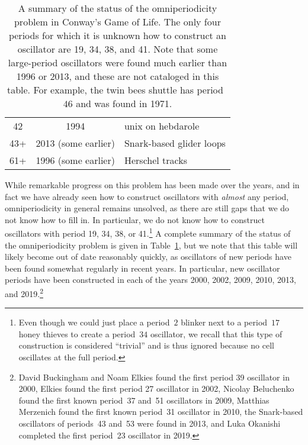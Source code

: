 \begin{table}[!ptb]
\begin{center}
\begin{tabular}{c c l}
			42 & 1994 & unix on hebdarole \\
			\rowcolor{gray!20} 43+ & 2013 (some earlier) & Snark-based glider loops \\
			61+ & 1996 (some earlier) & Herschel tracks \\\bottomrule
		\end{tabular}
		\caption{A summary of the status of the omniperiodicity problem in Conway's Game of Life. The only four periods for which it is unknown how to construct an oscillator are 19, 34, 38, and 41. Note that some large-period oscillators were found much earlier than 1996 or 2013, and these are not cataloged in this table. For example, the twin bees shuttle has period~$46$ and was found in 1971.}\label{tab:omniperiodic}
	\end{center}
\end{table}
\endgroup

While remarkable progress on this problem has been made over the years, and in fact we have already seen how to construct oscillators with \emph{almost} any period, omniperiodicity in general remains unsolved, as there are still gaps that we do not know how to fill in. In particular, we do not know how to construct oscillators with period 19, 34, 38, or 41.\footnote{Even though we could just place a period~$2$ blinker next to a period~$17$ honey thieves to create a period~$34$ oscillator, we recall that this type of construction is considered ``trivial'' and is thus ignored because no cell oscillates at the full period.} A complete summary of the status of the omniperiodicity problem is given in Table~\ref{tab:omniperiodic}, but we note that this table will likely become out of date reasonably quickly, as oscillators of new periods have been found somewhat regularly in recent years. In particular, new oscillator periods have been constructed in each of the years 2000, 2002, 2009, 2010, 2013, and 2019.\footnote{David Buckingham and Noam Elkies found the first period 39 oscillator in 2000, Elkies found the first period 27 oscillator in 2002, Nicolay Beluchenko found the first known period~37 and~51 oscillators in 2009, Matthias Merzenich found the first known period~31 oscillator in 2010, the Snark-based oscillators of periods~43 and~53 were found in 2013, and Luka Okanishi completed the first period~23 oscillator in 2019.}

